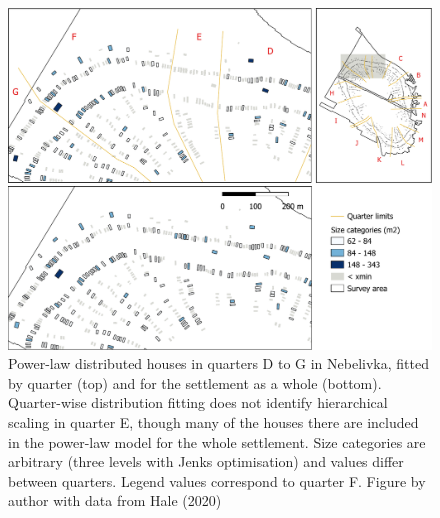 \documentclass[
  12pt,
]{book}
\begin{document}
\begin{figure}
\hypertarget{fig:06-quart-map}{%
\centering
\includegraphics{Results/fig06_quart_map.pdf}
\caption{Power-law distributed houses in quarters D to G in Nebelivka, fitted by quarter (top) and for the settlement as a whole (bottom). Quarter-wise distribution fitting does not identify hierarchical scaling in quarter E, though many of the houses there are included in the power-law model for the whole settlement. Size categories are arbitrary (three levels with Jenks optimisation) and values differ between quarters. Legend values correspond to quarter F. Figure by author with data from Hale (2020)}\label{fig:06-quart-map}
}
\end{figure}
\end{document}
